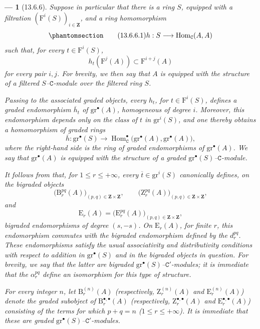 \documentclass[oneside]{amsart}
\theoremstyle{ega-env-style}
\newtheorem*{env}{---}
\theoremstyle{ega-thm-env-style}
\theoremstyle{ega-defn-env-style}
\def\bb{\mathbf}                    %
\def\cat{\mathtt}                   %
\def\leq{\leqslant}                 %
\def\Hom{\operatorname{Hom}}
\newcommand{\oldpage}[2][]{{\marginnote{\normalfont{\textbf{#1}~|~#2}}}\ignorespaces}
\let\EGAOriginalLabel\label
\renewcommand{\label}[1]{\phantomsection\EGAOriginalLabel{#1}}
\begin{document}
\begin{env}[13.6.6]
\label{0.13.6.6}
Suppose in particular that there is a ring $S$, equipped with a
\emph{filtration} $(\mathrm{F}^i(S))_{i\in\bb{Z}}$, and a ring
homomorphism
\begin{equation}
\label{0.13.6.6.1}
\tag{13.6.6.1}
  h:S\longrightarrow\Hom_{\cat{C}}(A,A)
\end{equation}
\oldpage[0\textsubscript{III}]{75}
such that, for every $t\in\mathrm{F}^i(S)$,
\[
  h_t(\mathrm{F}^j(A))
  \subset
  \mathrm{F}^{i+j}(A)
\]
for every pair $i,j$.
For brevity, we then say that $A$ is equipped with the structure of a
\emph{filtered $S$--$\cat{C}$-module} over the filtered ring $S$.

Passing to the associated graded objects, every $h_t$, for
$t\in\mathrm{F}^i(S)$, defines a graded endomorphism
$\overline{h}_t$ of $\mathrm{gr}^\bullet(A)$, homogeneous of degree
$i$.
Moreover, this endomorphism depends only on the class of $t$ in
$\mathrm{gr}^i(S)$, and one thereby obtains a homomorphism of
\emph{graded rings}
\[
  \overline{h}:
  \mathrm{gr}^\bullet(S)
  \longrightarrow
  \Hom_{\cat{C}}^\bullet
  \bigl(\mathrm{gr}^\bullet(A),\mathrm{gr}^\bullet(A)\bigr),
\]
where the right-hand side is the ring of graded endomorphisms of
$\mathrm{gr}^\bullet(A)$.
We say that $\mathrm{gr}^\bullet(A)$ is equipped with the structure
of a \emph{graded $\mathrm{gr}^\bullet(S)$--$\cat{C}$-module}.

It follows from  that, for
$1\leq r\leq+\infty$, every
$\overline{t}\in\mathrm{gr}^i(S)$ canonically defines, on the
bigraded objects
\[
  \bigl(\mathrm{B}_r^{pq}(A)\bigr)_{(p,q)\in\bb{Z}\times\bb{Z}},
  \qquad
  \bigl(\mathrm{Z}_r^{pq}(A)\bigr)_{(p,q)\in\bb{Z}\times\bb{Z}},
\]
and
\[
  \mathrm{E}_r(A)
  =
  \bigl(\mathrm{E}_r^{pq}(A)\bigr)_{(p,q)\in\bb{Z}\times\bb{Z}},
\]
bigraded endomorphisms of degree $(s,-s)$.
On $\mathrm{E}_r(A)$, for finite $r$, this endomorphism commutes with
the bigraded endomorphism defined by the $d_r^{pq}$.
These endomorphisms satisfy the usual associativity and
distributivity conditions with respect to addition in
$\mathrm{gr}^\bullet(S)$ and in the bigraded objects in question.
For brevity, we say that the latter are
\emph{bigraded $\mathrm{gr}^\bullet(S)$--$\cat{C}'$-modules};
it is immediate that the $\alpha_r^{pq}$ define an isomorphism for
this type of structure.

For every integer $n$, let $\mathrm{B}_r^{(n)}(A)$
(respectively, $\mathrm{Z}_r^{(n)}(A)$ and
$\mathrm{E}_r^{(n)}(A)$) denote the graded subobject of
$\mathrm{B}_r^{\bullet,\bullet}(A)$
(respectively, $\mathrm{Z}_r^{\bullet,\bullet}(A)$ and
$\mathrm{E}_r^{\bullet,\bullet}(A)$) consisting of the terms for
which $p+q=n$ ($1\leq r\leq+\infty$).
It is immediate that these are
\emph{graded $\mathrm{gr}^\bullet(S)$--$\cat{C}'$-modules}.


\end{env}
\end{document}
